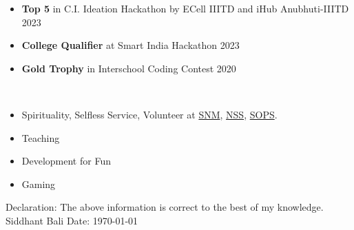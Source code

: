 \documentclass[10pt]{extarticle}
\newcommand{\yourname}{Siddhant Bali}%
\begin{document}
\begin{contained}
\vspace{0pt}
\begin{itemize}
    \setlength\itemsep{0.5pt}
    \item \textbf{Top 5} in C.I. Ideation Hackathon by ECell IIITD and iHub Anubhuti-IIITD 2023
    \item \textbf{College Qualifier} at Smart India Hackathon 2023
    \item \textbf{Gold Trophy} in Interschool Coding Contest 2020
\end{itemize}
\vspace{0pt}
\end{contained}
\begin{contained}\\
\begin{itemize}
    \setlength\itemsep{0.5pt}
    \item Spirituality, Selfless Service, Volunteer at \href{https://www.nirankari.org/}{SNM},
    \href{https://nss.gov.in/}{NSS},
    \href{https://sops.in/}{SOPS}.
    \item Teaching 
    \item Development for Fun
    \item Gaming
\end{itemize}
\end{contained}
Declaration: The above information is correct to the best of my knowledge.\newline
\yourname\newline
Date: \today
\end{document}
